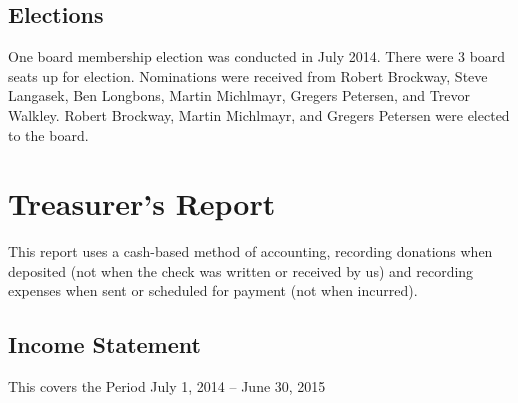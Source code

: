 \documentclass[letterpaper]{report}
\begin{document}
\section{Elections}

One board membership election was conducted in July 2014.  There were 3
board seats up for election.  Nominations were received from Robert
Brockway, Steve Langasek, Ben Longbons, Martin Michlmayr, Gregers
Petersen, and Trevor Walkley.  Robert Brockway, Martin Michlmayr, and
Gregers Petersen were elected to the board.

\chapter{Treasurer's Report}

This report uses a cash-based method of accounting, recording donations when
deposited (not when the check was written or received by us) and recording
expenses when sent or scheduled for payment (not when incurred).

\section{Income Statement}

This covers the Period July 1, 2014 -- June 30, 2015
\end{document}
